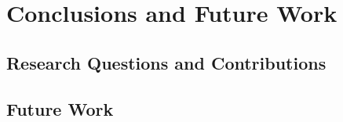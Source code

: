\setlength{\headheight}{1.2cm}
\renewcommand{\publ}{\flushleft\footnotesize{}}

\chapter{Conclusions and Future Work}
\label{chap:7}

\section{Research Questions and Contributions}
\label{sec:7.1}

\section{Future Work}
\label{sec:7.2}



